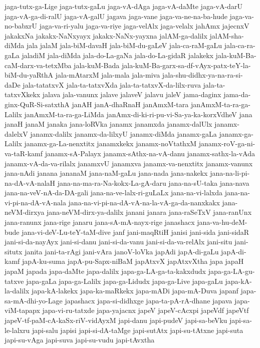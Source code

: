 {jaga-tutx-ga-Lige
jaga-tutx-gaLu
jaga-vA-dAga
jaga-vA-daMte
jaga-vA-darU
jaga-vA-ga-di-ralU
jaga-vA-galU
jagava
jaga-vane
jaga-va-ne-na-ba-hude
jaga-va-no-babxrU
jaga-va-ri-yalu
jaga-va-riye
jaga-velAlx
jaga-velalx
jahAmx
jajecnxV
jakakxNa
jakakx-NaNxyayx
jakakx-NaNx-yayxna
jalAM-ga-dalilx
jalAM-sha-diMda
jala
jalaM
jala-biM-davaH
jala-biM-du-gaLeV
jala-ca-raM-gaLu
jala-ca-ra-gaLa
jaladiM
jala-diMda
jala-do-La-gaNa
jala-do-La-gidaR
jalakekx
jala-kuM-Ba-caM-darx-va-tetxMba
jala-kuM-Bada
jala-kuM-Ba-garx-sa-df-vAyx-patx-teY-la-biM-du-yaRthA
jala-mAtarxM
jala-mala
jala-miva
jala-shu-didhx-ya-na-ra-si-daDe
jala-tatatxvX
jala-ta-tatxvXda
jala-ta-tatxvX-da-lilx-ruva
jala-ta-tatxvXkekx
jalava
jala-vanunx
jalave
jalaveV
jalavu
jaleV
jama-daginx
jama-da-ginx-QuR-Si-satxthA
janAH
janA-dhaRnaH
janAmxM-tara
janAmxM-ta-ra-ga-Lalilx
janAmxM-ta-ra-ga-LiMda
janAmx-di-ki-ri-pu-vi-Sa-ya-ka-korxVdheV
jana
janaH
janaM
janaka
jana-loRVka
janamx
janamxda
janamx-dalUlx
janamx-dalelxV
janamx-dalilx
janamx-da-lilxyU
janamx-diMda
janamx-gaLa
janamx-ga-Lalilx
janamx-ga-La-nenxtitx
janamxkekx
janamx-noVtathxM
janamx-roV-ga-ni-va-taR-kamf
janamx-sA-Palayx
janamx-sAthx-na-vA-danu
janamx-sathx-la-vAda
janamx-vA-da-va-rilalx
janamxvU
janamxva
janamx-va-nenxtitx
janamx-vanunx
jana-nAdi
janana
jananaM
jana-naM-gaLu
jana-nada
jana-nakekx
jana-na-li-pi-na-dA-vA-nalaH
jana-na-ma-ra-Na-kokx-La-gA-daru
jana-na-sU-taka
jana-nava
jana-na-veV-nA-da-DA-gali
jana-na-ve-lalx-ri-guLaLx
jana-na-vi-lalxda
jana-na-vi-pi-na-dA-vA-nala
jana-na-vi-pi-na-dA-vA-na-la-vA-ga-da-nanxkakx
jana-neVM-dirxya
jana-neVM-dirx-ya-dalilx
janani
janara
jana-raSeTxV
jana-ranUnx
jana-ranunx
jana-rige
janaru
jana-sA-mA-nayx-rige
janashacx
jana-va-hu-deM-bude
jana-vi-deV-Lu-teY-taM-dive
janf
jani-maqRtiH
janisi
jani-sida
jani-sidaR
jani-si-da-nayAyx
jani-si-danu
jani-si-da-vanu
jani-si-da-va-relAlx
jani-situ
jani-situtx
janita
jani-ta-rAgi
jani-vAra
janoV-loVka
japAdi
japA-di-gaLu
japA-di-kamf
japA-ku-suma
japA-pu-Sapx-niBaM
japAtxvX
japAtxvXtha
japa
japaH
japaM
japada
japa-daMte
japa-dalilx
japa-ga-LA-ga-ta-kakxdudx
japa-ga-LA-gu-tatxve
japa-gaLa
japa-ga-Lalilx
japa-ga-Lidudx
japa-ga-Live
japa-gaLu
japa-kA-la-dalilx
japa-kA-lakekx
japa-ka-maRkekx
japa-mADi
japa-mA-Duva
japanf
japa-sa-mA-dhi-yo-Lage
japashacx
japa-si-didhxge
japa-ta-pA-rA-dhane
japava
japa-viM-tapapx
japa-vi-ru-tatxde
japa-yajacnx
japeV
japeV-cAcxpi
japeVdf
japeVtf
japeV-tf-paM-cA-kaSx-riV-vidAyxM
japi-danu
japi-pudeV
japi-sa-beVku
japi-sa-le-lalxru
japi-salu
japisi
japi-si-dA-taMge
japi-sutAtx
japi-su-tAtxne
japi-suta
japi-su-vAga
japi-suva
japi-su-vudu
japi-tAvxtha
}
